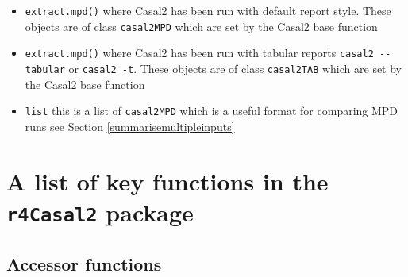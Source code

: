 \documentclass[
]{book}
\providecommand{\tightlist}{%
  \setlength{\itemsep}{0pt}\setlength{\parskip}{0pt}}
\begin{document}
\begin{itemize}
\tightlist
\item
  \texttt{extract.mpd()} where Casal2 has been run with default report style. These objects are of class \texttt{casal2MPD} which are set by the Casal2 base function
\item
  \texttt{extract.mpd()} where Casal2 has been run with tabular reports \texttt{casal2\ -\/-tabular} or \texttt{casal2\ -t}. These objects are of class \texttt{casal2TAB} which are set by the Casal2 base function
\item
  \texttt{list} this is a list of \texttt{casal2MPD} which is a useful format for comparing MPD runs see Section \ref{summarisemultipleinputs}
\end{itemize}

\hypertarget{functionlist}{%
\chapter{\texorpdfstring{A list of key functions in the \texttt{r4Casal2} package}{A list of key functions in the r4Casal2 package}}\label{functionlist}}

\hypertarget{accessor-functions}{%
\section{Accessor functions}\label{accessor-functions}}
\end{document}
